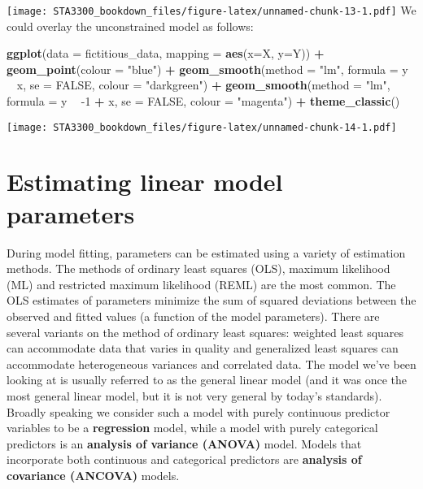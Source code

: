 \documentclass[
]{book}
\newenvironment{Shaded}{\begin{snugshade}}{\end{snugshade}}
\newcommand{\DataTypeTok}[1]{\textcolor[rgb]{0.13,0.29,0.53}{#1}}
\newcommand{\DecValTok}[1]{\textcolor[rgb]{0.00,0.00,0.81}{#1}}
\newcommand{\KeywordTok}[1]{\textcolor[rgb]{0.13,0.29,0.53}{\textbf{#1}}}
\newcommand{\NormalTok}[1]{#1}
\newcommand{\OperatorTok}[1]{\textcolor[rgb]{0.81,0.36,0.00}{\textbf{#1}}}
\newcommand{\OtherTok}[1]{\textcolor[rgb]{0.56,0.35,0.01}{#1}}
\newcommand{\StringTok}[1]{\textcolor[rgb]{0.31,0.60,0.02}{#1}}
\begin{document}
\texttt{[image: STA3300\_bookdown\_files/figure-latex/unnamed-chunk-13-1.pdf]}
We could overlay the unconstrained model as follows:

\begin{Shaded}
\begin{Highlighting}[]
\KeywordTok{ggplot}\NormalTok{(}\DataTypeTok{data =}\NormalTok{ fictitious_data,}
       \DataTypeTok{mapping =} \KeywordTok{aes}\NormalTok{(}\DataTypeTok{x=}\NormalTok{X, }\DataTypeTok{y=}\NormalTok{Y)) }\OperatorTok{+}
\StringTok{   }\KeywordTok{geom_point}\NormalTok{(}\DataTypeTok{colour =} \StringTok{"blue"}\NormalTok{) }\OperatorTok{+}
\StringTok{   }\KeywordTok{geom_smooth}\NormalTok{(}\DataTypeTok{method =} \StringTok{"lm"}\NormalTok{,}
               \DataTypeTok{formula =}\NormalTok{ y }\OperatorTok{~}\StringTok{ }\NormalTok{x,}
               \DataTypeTok{se =} \OtherTok{FALSE}\NormalTok{,}
               \DataTypeTok{colour =} \StringTok{"darkgreen"}\NormalTok{) }\OperatorTok{+}
\StringTok{   }\KeywordTok{geom_smooth}\NormalTok{(}\DataTypeTok{method =} \StringTok{"lm"}\NormalTok{,}
               \DataTypeTok{formula =}\NormalTok{ y }\OperatorTok{~}\StringTok{ }\DecValTok{-1} \OperatorTok{+}\StringTok{ }\NormalTok{x,}
               \DataTypeTok{se =} \OtherTok{FALSE}\NormalTok{,}
               \DataTypeTok{colour =} \StringTok{"magenta"}\NormalTok{) }\OperatorTok{+}
\StringTok{   }\KeywordTok{theme_classic}\NormalTok{()}
\end{Highlighting}
\end{Shaded}

\texttt{[image: STA3300\_bookdown\_files/figure-latex/unnamed-chunk-14-1.pdf]}

\hypertarget{estimating-linear-model-parameters}{%
\section{Estimating linear model parameters}\label{estimating-linear-model-parameters}}

During model fitting, parameters can be estimated using a variety of estimation methods. The methods of ordinary least squares (OLS), maximum likelihood (ML) and restricted maximum likelihood (REML) are the most common. The OLS estimates of parameters minimize the sum of squared deviations between the observed and fitted values (a function of the model parameters). There are several variants on the method of ordinary least squares: weighted least squares can accommodate data that varies in quality and generalized least squares can accommodate heterogeneous variances and correlated data. The model we've been looking at is usually referred to as the general linear model (and it was once the most general linear model, but it is not very general by today's standards). Broadly speaking we consider such a model with purely continuous predictor variables to be a \textbf{regression} model, while a model with purely categorical predictors is an \textbf{analysis of variance (ANOVA)} model. Models that incorporate both continuous and categorical predictors are \textbf{analysis of covariance (ANCOVA)} models.
\end{document}
